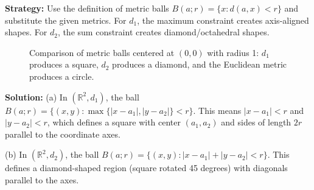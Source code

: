 \noindent\textbf{Strategy:} Use the definition of metric balls $B(a;r) = \{x : d(a,x) < r\}$ and substitute the given metrics. For $d_1$, the maximum constraint creates axis-aligned shapes. For $d_2$, the sum constraint creates diamond/octahedral shapes.

\begin{figure}[h]
\centering
{}
\caption{Comparison of metric balls centered at $(0,0)$ with radius 1: $d_1$ produces a square, $d_2$ produces a diamond, and the Euclidean metric produces a circle.}
\end{figure}

\bigskip\noindent\textbf{Solution:} 
(a) In $(\mathbb{R}^2, d_1)$, the ball $B(a;r) = \{(x,y) : \max\{|x-a_1|, |y-a_2|\} < r\}$. This means $|x-a_1| < r$ and $|y-a_2| < r$, which defines a square with center $(a_1,a_2)$ and sides of length $2r$ parallel to the coordinate axes.

(b) In $(\mathbb{R}^2, d_2)$, the ball $B(a;r) = \{(x,y) : |x-a_1| + |y-a_2| < r\}$. This defines a diamond-shaped region (square rotated 45 degrees) with diagonals parallel to the axes.

